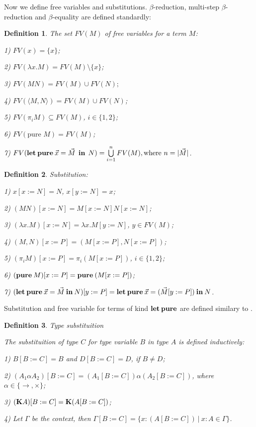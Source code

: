 \documentclass[a4paper]{article}
\newtheorem{defin}{Definition}
\begin{document}
  \vspace{\baselineskip}

  Now we define free variables and substitutions. $\beta$-reduction, multi-step $\beta$-reduction and $\beta$-equality are defined standardly:

  \begin{defin} The set $FV(M)$ of free variables for a term $M$:

  1) $FV(x) = \{ x \}$;

  2) $FV(\lambda x. M) = FV(M) \setminus \{ x\}$;

  3) $FV(M N) = FV(M) \cup FV(N);$

  4) $FV(\langle M,N \rangle) = FV(M) \cup FV(N)$;

  5) $FV(\pi_i M) \subseteq FV(M)$, $i \in \{ 1, 2\}$;

  6) $FV(\text{pure } M) = FV(M)$;

  7) $FV({\bf let \: pure} \: \vec{x} = \vec{M} \:\: {\bf in} \:\: N) = \bigcup \limits_{i = 1}^n FV(M), \text{where $n = |\vec{M}|$}$.
  \end{defin}

  \begin{defin} Substitution:

  1) $x [x := N] = N$, $x [y := N] = x$;

  2) $(M N) [x := N] = M[x := N] N [x := N]$;

  3) $(\lambda x. M) [x := N] = \lambda x. M [y := N]$, $y \in FV(M)$;

  4) $(M, N)[x := P] = (M[x := P], N [x := P])$;

  5) $(\pi_i M) [x := P] = \pi_i (M[x := P])$, $i \in \{ 1, 2\}$;

  6) $({\bf pure \: } M) [x := P] = {\bf pure \: } (M [x := P])$;

  7) $({\bf let \: pure \:}\vec{x} = \vec{M} {\: \bf in \:} N) [y := P] = {\bf let \: pure \:} \vec{x} = (\vec{M} [y := P]) {\: \bf in \:} N$.
  \end{defin}

Substitution and free variable for terms of kind ${\bf let \: pure}$ are defined similary to \cite{ModalK}.

  \begin{defin} Type substituition

    The substituition of type $C$ for type variable $B$ in type $A$ is defined inductively:

    1) $B [B := C] = B$ and $D [B := C] = D$, if $B \neq D$;

    2) $(A_1 \alpha A_2)[B := C] = (A_1[B := C]) \alpha (A_2[B := C])$, where $\alpha \in \{ \to, \times \}$;

    3) $({\bf K}A)[B := C] = {\bf K}(A [B := C])$;

    4) Let $\Gamma$ be the context, then $\Gamma [B := C] = \{ x : (A[B := C]) \: | \: x : A \in \Gamma \}$.
  \end{defin}
\end{document}
